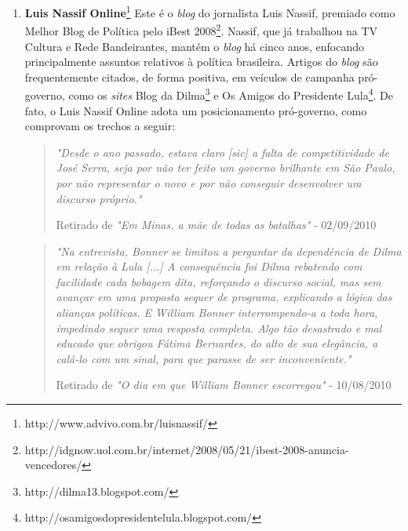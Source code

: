 \begin{enumerate}

\item \textbf{Luis Nassif Online}\footnote{http://www.advivo.com.br/luisnassif/} Este é o \emph{blog} do jornalista Luis Nassif, premiado como Melhor Blog de Política pelo iBest 2008\footnote{http://idgnow.uol.com.br/internet/2008/05/21/ibest-2008-anuncia-vencedores/}. Nassif, que já trabalhou na TV Cultura e Rede Bandeirantes, mantém o \emph{blog} há cinco anos, enfocando principalmente assuntos relativos à política brasileira. Artigos do \emph{blog} são frequentemente citados, de forma positiva, em veículos de campanha pró-governo, como os \emph{sites} Blog da Dilma\footnote{http://dilma13.blogspot.com/} e Os Amigos do Presidente Lula\footnote{http://osamigosdopresidentelula.blogspot.com/}. De fato, o Luis Nassif Online adota um posicionamento pró-governo, como comprovam os trechos a seguir:

\begin{quote}
\emph{"Desde o ano passado, estava claro [sic] a falta de competitividade de José Serra, seja por não ter feito um governo brilhante em São Paulo, por não representar o novo e por não conseguir desenvolver um discurso próprio."}

{\small Retirado de \emph{"Em Minas, a mãe de todas as batalhas"} - 02/09/2010} 
\end{quote}

\begin{quote}

\emph{"Na entrevista, Bonner se limitou a perguntar da dependência de Dilma em relação à Lula [...] A consequência foi Dilma rebatendo com facilidade cada bobagem dita, reforçando o discurso social, mas sem avançar em uma proposta sequer de programa, explicando a lógica das alianças políticas. E William Bonner interrompendo-a a toda hora, impedindo sequer uma resposta completa. Algo tão desastrado e mal educado que obrigou Fátima Bernardes, do alto de sua elegância, a calá-lo com um sinal, para que parasse de ser inconveniente."}

{ \small Retirado de \emph{"O dia em que William Bonner escorregou"} - 10/08/2010}

\end{quote}



\end{enumerate}
